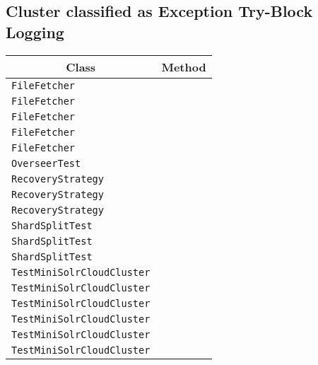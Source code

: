 \subsection{Cluster classified as Exception Try-Block Logging}

\begin{center}
\begin{tabular}{ll}\toprule
\multicolumn{1}{c}{Class}&\multicolumn{1}{c}{Method}\\\midrule
\lstinline/FileFetcher/&\raisebox{0pt}{\lstinline/cleanup()/}\\
\lstinline/FileFetcher/&\raisebox{0pt}{\lstinline/cleanup()/}\\
\lstinline/FileFetcher/&\raisebox{0pt}{\lstinline/cleanup()/}\\
\lstinline/FileFetcher/&\raisebox{0pt}{\lstinline/cleanup()/}\\
\lstinline/FileFetcher/&\raisebox{0pt}{\lstinline/cleanup()/}\\
\lstinline/OverseerTest/&\raisebox{0pt}{\lstinline/RemovalOfLastReplica()/}\\
\lstinline/RecoveryStrategy/&\raisebox{0pt}{\lstinline/replay(SolrCore)/}\\
\lstinline/RecoveryStrategy/&\raisebox{0pt}{\lstinline/replay(SolrCore)/}\\
\lstinline/RecoveryStrategy/&\raisebox{0pt}{\lstinline/replay(SolrCore)/}\\
\lstinline/ShardSplitTest/&\raisebox{0pt}{\lstinline/logDebugHelp(QueryResponser,long)/}\\
\lstinline/ShardSplitTest/&\raisebox{0pt}{\lstinline/logDebugHelp(QueryResponser,long)/}\\
\lstinline/ShardSplitTest/&\raisebox{0pt}{\lstinline/logDebugHelp(QueryResponser,long)/}\\
\lstinline/TestMiniSolrCloudCluster/&\raisebox{0pt}{\lstinline/createSearchDelete()/}\\
\lstinline/TestMiniSolrCloudCluster/&\raisebox{0pt}{\lstinline/createSearchDelete()/}\\
\lstinline/TestMiniSolrCloudCluster/&\raisebox{0pt}{\lstinline/createSearchDelete()/}\\
\lstinline/TestMiniSolrCloudCluster/&\raisebox{0pt}{\lstinline/createSearchDelete()/}\\
\lstinline/TestMiniSolrCloudCluster/&\raisebox{0pt}{\lstinline/createSearchDelete()/}\\
\lstinline/TestMiniSolrCloudCluster/&\raisebox{0pt}{\lstinline/createSearchDelete()/}\\

\end{tabular}
\end{center}
